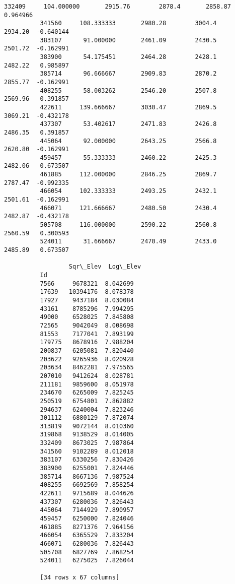\documentclass[11pt]{article}
\begin{document}
\begin{Verbatim}[commandchars=\\\{\}]
          332409     104.000000       2915.76        2878.4       2858.87   0.964966   
          341560     108.333333       2980.28        3004.4       2934.20  -0.640144   
          383107      91.000000       2461.09        2430.5       2501.72  -0.162991   
          383900      54.175451       2464.28        2428.1       2482.22   0.985897   
          385714      96.666667       2909.83        2870.2       2855.77  -0.162991   
          408255      58.003262       2546.20        2507.8       2569.96   0.391857   
          422611     139.666667       3030.47        2869.5       3069.21  -0.432178   
          437307      53.402617       2471.83        2426.8       2486.35   0.391857   
          445064      92.000000       2643.25        2566.8       2620.80  -0.162991   
          459457      55.333333       2460.22        2425.3       2482.06   0.673507   
          461885     112.000000       2846.25        2869.7       2787.47  -0.992335   
          466054     102.333333       2493.25        2432.1       2501.61  -0.162991   
          466071     121.666667       2480.50        2430.4       2482.87  -0.432178   
          505708     116.000000       2590.22        2560.8       2560.59   0.300593   
          524011      31.666667       2470.49        2433.0       2485.89   0.673507   
          
                  Sqr\_Elev  Log\_Elev  
          Id                          
          7566     9678321  8.042699  
          17639   10394176  8.078378  
          17927    9437184  8.030084  
          43161    8785296  7.994295  
          49000    6528025  7.845808  
          72565    9042049  8.008698  
          81553    7177041  7.893199  
          179775   8678916  7.988204  
          200837   6205081  7.820440  
          203622   9265936  8.020928  
          203634   8462281  7.975565  
          207010   9412624  8.028781  
          211181   9859600  8.051978  
          234670   6265009  7.825245  
          250519   6754801  7.862882  
          294637   6240004  7.823246  
          301112   6880129  7.872074  
          313819   9072144  8.010360  
          319868   9138529  8.014005  
          332409   8673025  7.987864  
          341560   9102289  8.012018  
          383107   6330256  7.830426  
          383900   6255001  7.824446  
          385714   8667136  7.987524  
          408255   6692569  7.858254  
          422611   9715689  8.044626  
          437307   6280036  7.826443  
          445064   7144929  7.890957  
          459457   6250000  7.824046  
          461885   8271376  7.964156  
          466054   6365529  7.833204  
          466071   6280036  7.826443  
          505708   6827769  7.868254  
          524011   6275025  7.826044  
          
          [34 rows x 67 columns]
\end{Verbatim}
            
\end{document}
